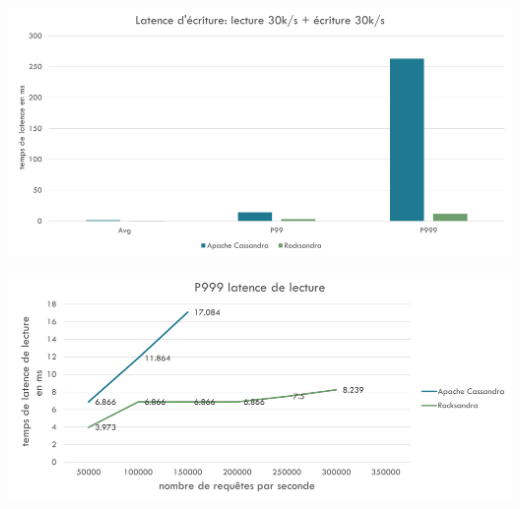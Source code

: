 \documentclass[12pt, letterpaper]{report}
\begin{document}
\begin{center}
	\includegraphics[width=\textwidth]{latence_ecriture}
\end{center}
\begin{center}
	\includegraphics[width=\textwidth]{p999}
\end{center}
\end{document}
